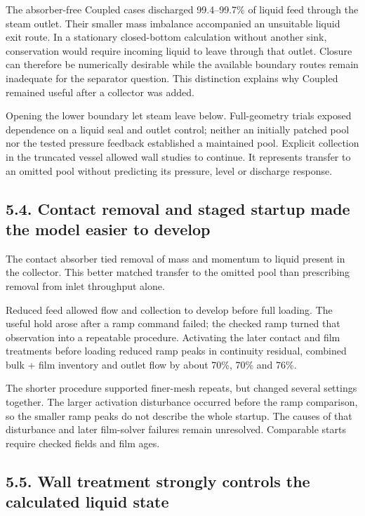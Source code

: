 \documentclass[
  12pt,
  a4paper,
]{article}
\begin{document}
The absorber-free Coupled cases discharged 99.4--99.7\% of liquid feed
through the steam outlet. Their smaller mass imbalance accompanied an
unsuitable liquid exit route. In a stationary closed-bottom calculation
without another sink, conservation would require incoming liquid to
leave through that outlet. Closure can therefore be numerically
desirable while the available boundary routes remain inadequate for the
separator question. This distinction explains why Coupled remained
useful after a collector was added.

Opening the lower boundary let steam leave below. Full-geometry trials
exposed dependence on a liquid seal and outlet control; neither an
initially patched pool nor the tested pressure feedback established a
maintained pool. Explicit collection in the truncated vessel allowed
wall studies to continue. It represents transfer to an omitted pool
without predicting its pressure, level or discharge response.

\subsection{5.4. Contact removal and staged startup made the model
easier to
develop}\label{contact-removal-and-staged-startup-made-the-model-easier-to-develop}

The contact absorber tied removal of mass and momentum to liquid present
in the collector. This better matched transfer to the omitted pool than
prescribing removal from inlet throughput alone.

Reduced feed allowed flow and collection to develop before full loading.
The useful hold arose after a ramp command failed; the checked ramp
turned that observation into a repeatable procedure. Activating the
later contact and film treatments before loading reduced ramp peaks in
continuity residual, combined bulk + film inventory and outlet flow by
about 70\%, 70\% and 76\%.

The shorter procedure supported finer-mesh repeats, but changed several
settings together. The larger activation disturbance occurred before the
ramp comparison, so the smaller ramp peaks do not describe the whole
startup. The causes of that disturbance and later film-solver failures
remain unresolved. Comparable starts require checked fields and film
ages.

\subsection{5.5. Wall treatment strongly controls the calculated liquid
state}\label{wall-treatment-strongly-controls-the-calculated-liquid-state}
\end{document}
